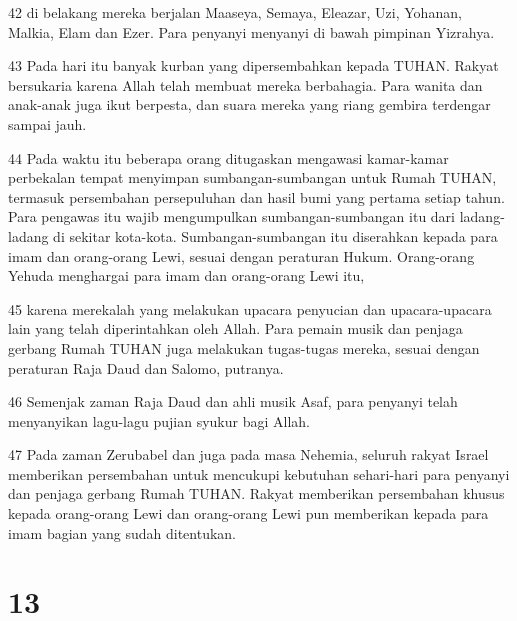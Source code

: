 \par 42 di belakang mereka berjalan Maaseya, Semaya, Eleazar, Uzi, Yohanan, Malkia, Elam dan Ezer. Para penyanyi menyanyi di bawah pimpinan Yizrahya.
\par 43 Pada hari itu banyak kurban yang dipersembahkan kepada TUHAN. Rakyat bersukaria karena Allah telah membuat mereka berbahagia. Para wanita dan anak-anak juga ikut berpesta, dan suara mereka yang riang gembira terdengar sampai jauh.
\par 44 Pada waktu itu beberapa orang ditugaskan mengawasi kamar-kamar perbekalan tempat menyimpan sumbangan-sumbangan untuk Rumah TUHAN, termasuk persembahan persepuluhan dan hasil bumi yang pertama setiap tahun. Para pengawas itu wajib mengumpulkan sumbangan-sumbangan itu dari ladang-ladang di sekitar kota-kota. Sumbangan-sumbangan itu diserahkan kepada para imam dan orang-orang Lewi, sesuai dengan peraturan Hukum. Orang-orang Yehuda menghargai para imam dan orang-orang Lewi itu,
\par 45 karena merekalah yang melakukan upacara penyucian dan upacara-upacara lain yang telah diperintahkan oleh Allah. Para pemain musik dan penjaga gerbang Rumah TUHAN juga melakukan tugas-tugas mereka, sesuai dengan peraturan Raja Daud dan Salomo, putranya.
\par 46 Semenjak zaman Raja Daud dan ahli musik Asaf, para penyanyi telah menyanyikan lagu-lagu pujian syukur bagi Allah.
\par 47 Pada zaman Zerubabel dan juga pada masa Nehemia, seluruh rakyat Israel memberikan persembahan untuk mencukupi kebutuhan sehari-hari para penyanyi dan penjaga gerbang Rumah TUHAN. Rakyat memberikan persembahan khusus kepada orang-orang Lewi dan orang-orang Lewi pun memberikan kepada para imam bagian yang sudah ditentukan.

\chapter{13}

